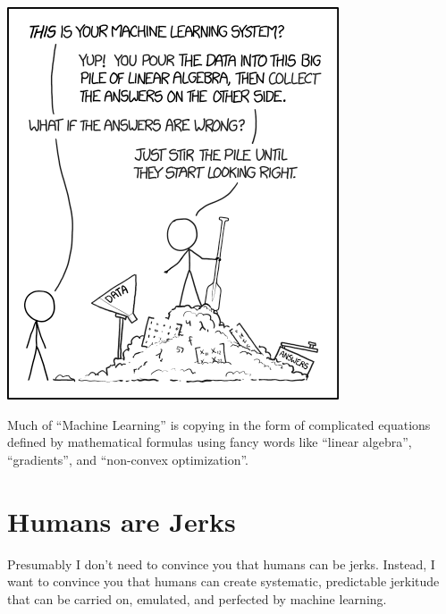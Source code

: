\begin{marginfigure}%
  \includegraphics[width=\linewidth]{figures/xkcd-la-ml}
  \caption{Much of ``Machine Learning'' is copying in the form of
    complicated equations defined by mathematical formulas using fancy
    words like ``linear algebra'', ``gradients'', and ``non-convex optimization''.}
  \label{fig:la-ml}
\end{marginfigure}

\section{Humans are Jerks}



Presumably I don't need to convince you that humans can be jerks.
Instead, I want to convince you that humans can create systematic,
predictable jerkitude that can be carried on, emulated, and perfected
by machine learning.

